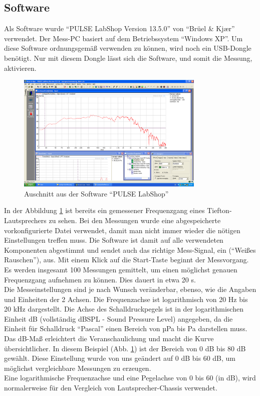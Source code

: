 \subsection*{Software}\label{subsec:4.1.1}
Als Software wurde \enquote{PULSE LabShop Version 13.5.0} von \enquote{Brüel \& Kj\ae r} verwendet.
Der Mess-PC basiert auf dem Betriebssystem \enquote{Windows XP}.
Um diese Software ordnungsgemäß verwenden zu können, wird noch ein USB-Dongle benötigt.
Nur mit diesem Dongle lässt sich die Software, und somit die Messung, aktivieren.
\begin{figure} [H]
	\centering
	\includegraphics[width=0.8\textwidth]{img/LSMessung/VisatonMitSilikonMitWolle.png}
	\caption{Auschnitt aus der Software \enquote{PULSE LabShop}}
	\label{fig:4.1.1.1}
\end{figure}
In der Abbildung \ref{fig:4.1.1.1} ist bereits ein gemessener Frequenzgang eines Tiefton-Lautsprechers zu sehen.
Bei den Messungen wurde eine abgespeicherte vorkonfigurierte Datei verwendet, damit man nicht immer wieder die nötigen Einstellungen treffen muss.
Die Software ist damit auf alle verwendeten Komponenten abgestimmt und sendet auch das richtige Mess-Signal, ein (\enquote{Weißes Rauschen}), aus.
Mit einem Klick auf die Start-Taste beginnt der Messvorgang.
Es werden insgesamt 100 Messungen gemittelt, um einen möglichst genauen Frequenzgang aufnehmen zu können.
Dies dauert in etwa 20 s.
\\
Die Messeinstellungen sind je nach Wunsch veränderbar, ebenso, wie die Angaben und Einheiten der 2 Achsen.
Die Frequenzachse ist logarithmisch von 20 Hz bis 20 kHz dargestellt.
Die Achse des Schalldruckpegels ist in der logarithmischen Einheit dB (vollständig dBSPL - Sound Pressure Level) angegeben, da die Einheit für Schalldruck \enquote{Pascal} einen Bereich von µPa bis Pa darstellen muss.
Das dB-Maß erleichtert die Veranschaulichung und macht die Kurve übersichtlicher.
In diesem Beispiel (Abb. \ref{fig:4.1.1.1}) ist der Bereich von 0 dB bis 80 dB gewählt.
Diese Einstellung wurde von uns geändert auf 0 dB bis 60 dB, um möglichst vergleichbare Messungen zu erzeugen.\\
Eine logarithmische Frequenzachse und eine Pegelachse von 0 bis 60 (in dB), wird normalerweise für den Vergleich von Lautsprecher-Chassis verwendet.


